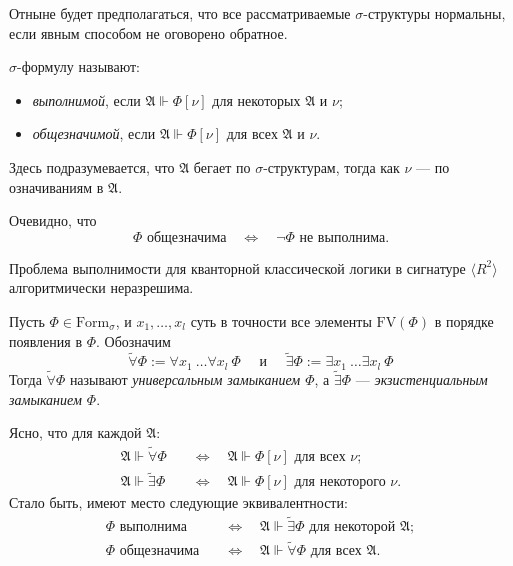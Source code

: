 \documentclass[12pt,a4paper]{article}
\newcommand{\Formul}{\ensuremath{\mathrm{Form}}\xspace}
\newcommand{\FV}{\ensuremath{\mathrm{FV}}\xspace}
\newcommand{\tildeforall}{\widetilde{\forall}}
\newcommand{\tildeexists}{\widetilde{\exists}}
\begin{document}
    Отныне будет предполагаться, что все рассматриваемые $\sigma$-структуры нормальны, если явным способом не оговорено обратное.

    \begin{definition}
        $\sigma$-формулу называют:
        \begin{itemize}
            \item \emph{выполнимой}, если $\mathfrak{A} \Vdash \Phi[\nu]$ для некоторых $\mathfrak{A}$ и $\nu$;
            \item \emph{общезначимой}, если $\mathfrak{A} \Vdash \Phi[\nu]$ для всех $\mathfrak{A}$ и $\nu$.
        \end{itemize}
        Здесь подразумевается, что $\mathfrak{A}$ бегает по $\sigma$-структурам, тогда как $\nu$ --- по означиваниям в $\mathfrak{A}$.
    \end{definition}

    \begin{remark}
        Очевидно, что
        \[\Phi \text{ общезначима} \quad \Longleftrightarrow \quad \neg \Phi \text{ не выполнима.}\]
    \end{remark}

    \begin{theorem}
        Проблема выполнимости для кванторной классической логики в сигнатуре $\langle R^2 \rangle$ алгоритмически неразрешима.
    \end{theorem}

    \begin{definition}
        Пусть $\Phi \in \Formul_\sigma$, и $x_1, \dots, x_l$ суть в точности все элементы $\FV(\Phi)$ в порядке появления в $\Phi$. Обозначим
        \[
            \tildeforall \Phi := \forall x_1\ \dots \forall x_l\ \Phi
            \quad \text{ и }\quad
            \tildeexists \Phi := \exists x_1\ \dots \exists x_l\ \Phi
        \]
        Тогда $\tildeforall \Phi$ называют \emph{универсальным замыканием $\Phi$}, а $\tildeexists \Phi$ --- \emph{экзистенциальным замыканием $\Phi$}.
    \end{definition}

    \begin{remark}
        Ясно, что для каждой $\mathfrak{A}$:
        \begin{align*}
            \mathfrak{A} \Vdash \tildeforall \Phi \quad &\Longleftrightarrow \quad \mathfrak{A} \Vdash \Phi[\nu] \text{ для всех } \nu;\\
            \mathfrak{A} \Vdash \tildeexists \Phi \quad &\Longleftrightarrow \quad \mathfrak{A} \Vdash \Phi[\nu] \text{ для некоторого } \nu.
        \end{align*}
        Стало быть, имеют место следующие эквивалентности:
        \begin{align*}
            \Phi \text{ выполнима} \quad &\Longleftrightarrow \quad \mathfrak{A} \Vdash \tildeexists \Phi \text{ для некоторой } \mathfrak{A};\\
            \Phi \text{ общезначима} \quad &\Longleftrightarrow \quad \mathfrak{A} \Vdash \tildeforall \Phi \text{ для всех } \mathfrak{A}.
        \end{align*}
    \end{remark}
\end{document}

